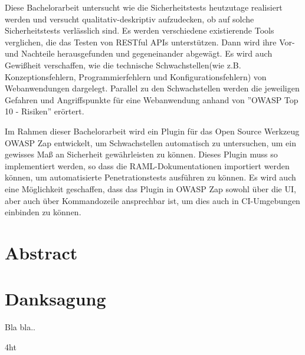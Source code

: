 \documentclass[
               paper=a4,
               twoside,  %
               bibliography=totoc,
               headsepline,
               cleardoublepage=empty,
               parskip=half,
               final
               ]{scrbook}
\begin{document}
Diese Bachelorarbeit untersucht wie die Sicherheitstests heutzutage realisiert werden und versucht qualitativ-deskriptiv aufzudecken, ob auf solche Sicherheitstests verlässlich sind. Es werden verschiedene existierende Tools verglichen, die das Testen von RESTful APIs unterstützen. Dann wird ihre Vor- und Nachteile herausgefunden und gegeneinander abgewägt. Es wird auch Gewißheit verschaffen, wie die technische Schwachstellen(wie z.B. Konzeptionsfehlern, Programmierfehlern und Konfigurationsfehlern) von Webanwendungen dargelegt. Parallel zu den Schwachstellen werden die jeweiligen Gefahren und Angriffspunkte für eine Webanwendung anhand von ''OWASP Top 10 - Risiken'' erörtert.

Im Rahmen dieser Bachelorarbeit wird ein Plugin für das Open Source Werkzeug OWASP Zap entwickelt, um Schwachstellen automatisch zu untersuchen, um ein gewisses Maß an Sicherheit gewährleisten zu können. Dieses Plugin muss so implementiert werden, so dass die RAML-Dokumentationen importiert werden können, um automatisierte Penetrationstests ausführen zu können. Es wird auch eine Möglichkeit geschaffen, dass das Plugin in OWASP Zap sowohl über die UI, aber auch über Kommandozeile ansprechbar ist, um dies auch in CI-Umgebungen einbinden zu können.

\else
\section*{Abstract}
\fi

\cleardoublepage

\section*{Danksagung}
Bla bla..




\cleardoublepage




\iftex4ht
\else
{}
\fi

%
%

%
%
%
\setcounter{secnumdepth}{3}
\setcounter{tocdepth}{3}
\tableofcontents
\end{document}
